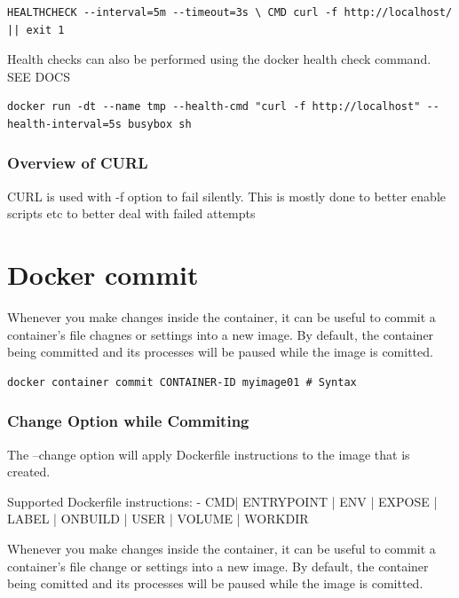 \documentclass[11pt]{book}
\begin{document}
    \begin{lstlisting}[style=dockerstyle,caption={Example Dockerfile}]
        HEALTHCHECK --interval=5m --timeout=3s \ CMD curl -f http://localhost/ || exit 1
    \end{lstlisting}

    Health checks can also be performed using the docker health check command. SEE DOCS

    \begin{lstlisting}[style=terminal]
        docker run -dt --name tmp --health-cmd "curl -f http://localhost" --health-interval=5s busybox sh
    \end{lstlisting}

    \subsubsection{Overview of CURL}
    CURL is used with -f option to fail silently.
    This is mostly done to better enable scripts etc to better deal with failed attempts


    \section{Docker commit}
    Whenever you make changes inside the container, it can be useful to commit a container's file chagnes or settings into a new image.
    By default, the container being committed and its processes will be paused while the image is comitted.

    \begin{lstlisting}[style=terminal]
        docker container commit CONTAINER-ID myimage01 # Syntax
    \end{lstlisting}

    \subsubsection{Change Option while Commiting}
    The --change option will apply Dockerfile instructions to the image that is created.

    Supported Dockerfile instructions:
    - CMD| ENTRYPOINT | ENV | EXPOSE | LABEL | ONBUILD | USER | VOLUME | WORKDIR

    Whenever you make changes inside the container, it can be useful to commit a container's file change or settings into a new image.
    By default, the container being comitted and its processes will be paused while the image is comitted.
\end{document}
